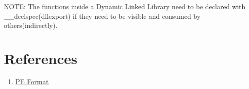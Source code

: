 \documentclass{article}
\begin{document}
NOTE: The functions inside a Dynamic Linked Library need to be declared
with \_\_declspec(dllexport) if they need to be visible and consumed
by others(indirectly).

\section{References}
\begin{enumerate}[noitemsep]
\item \href{https://docs.microsoft.com/en-us/windows/desktop/debug/pe-format}{PE Format}
\end{enumerate}
\end{document}
